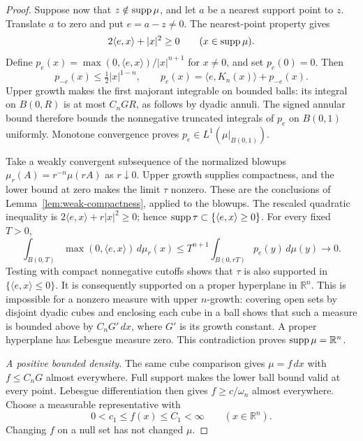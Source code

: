 \begin{proof}
Suppose now that $z\notin\operatorname{supp}\mu$, and let $a$ be a nearest support
point to $z$.  Translate $a$ to zero and put $e=a-z\ne0$.
The nearest-point property gives
\[
 2\langle e,x\rangle+|x|^2\ge0\qquad(x\in\operatorname{supp}\mu).
\]
Define
$p_e(x)=\max(0,\langle e,x\rangle)/|x|^{n+1}$ for $x\ne0$,
and set $p_e(0)=0$.  Then
\[
 p_{-e}(x)\le\tfrac12|x|^{1-n},\qquad
 p_e(x)=\langle e,K_n(x)\rangle+p_{-e}(x).
\]
Upper growth makes the first majorant integrable on bounded balls: its
integral on $B(0,R)$ is at most $C_nGR$, as follows by dyadic annuli.
The signed annular bound therefore bounds the nonnegative truncated
integrals of $p_e$ on $B(0,1)$ uniformly.  Monotone convergence proves
$p_e\in L^1(\mu|_{B(0,1)})$.

Take a weakly convergent subsequence of the normalized blowups
$\mu_r(A)=r^{-n}\mu(rA)$ as $r\downarrow0$.
Upper growth supplies compactness, and the lower bound at zero makes the
limit $\tau$ nonzero.  These are the conclusions of
Lemma~\ref{lem:weak-compactness}, applied to the blowups.  The rescaled
quadratic inequality is
$2\langle e,x\rangle+r|x|^2\ge0$; hence
$\operatorname{supp}\tau\subset\{\langle e,x\rangle\ge0\}$.
For every fixed $T>0$,
\[
 \int_{B(0,T)}\max(0,\langle e,x\rangle)\,d\mu_r(x)
 \le T^{n+1}\int_{B(0,rT)}p_e(y)\,d\mu(y)\longrightarrow0.
\]
Testing with compact nonnegative cutoffs shows that $\tau$ is also
supported in $\{\langle e,x\rangle\le0\}$.  It is consequently supported
on a proper hyperplane in $\mathbb R^n$.  This is impossible for a
nonzero measure with upper $n$-growth: covering open sets by disjoint
dyadic cubes and enclosing each cube in a ball shows that such a measure
is bounded above by $C_nG'\,dx$, where $G'$ is its growth constant.
A proper hyperplane has Lebesgue measure zero.  This contradiction proves
$\operatorname{supp}\mu=\mathbb R^n$.

\emph{A positive bounded density.}
The same cube comparison gives $\mu=f\,dx$ with $f\le C_nG$ almost
everywhere.  Full support makes the lower ball bound valid at every
point.  Lebesgue differentiation then gives $f\ge c/\omega_n$ almost
everywhere.  Choose a measurable representative with
\begin{equation}\label{eq:planar-two-sided-density}
 0<c_1\le f(x)\le C_1<\infty\qquad(x\in\mathbb R^n).
\end{equation}
Changing $f$ on a null set has not changed $\mu$.


\end{proof}

